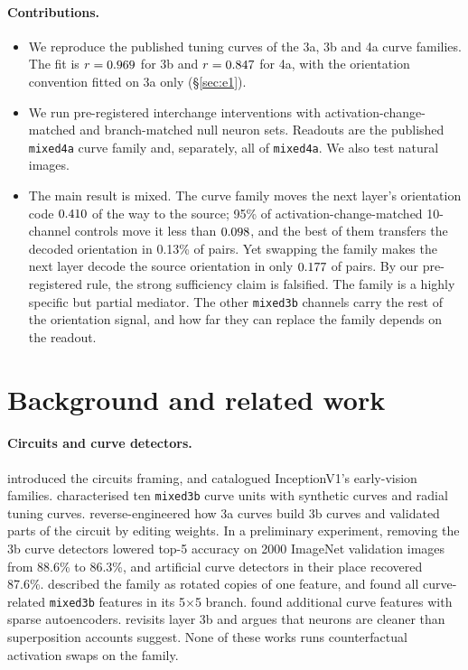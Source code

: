 \documentclass[11pt]{article}
\begin{document}
\paragraph{Contributions.}
\begin{itemize}
\item We reproduce the published tuning curves of the 3a, 3b and 4a curve families. The fit is $r=0.969$ for 3b and $r=0.847$ for 4a, with the orientation convention fitted on 3a only (\S\ref{sec:e1}).
\item We run pre-registered interchange interventions with activation-change-matched and branch-matched null neuron sets. Readouts are the published \texttt{mixed4a} curve family and, separately, all of \texttt{mixed4a}. We also test natural images.
\item The main result is mixed. The curve family moves the next layer's orientation code $0.410$ of the way to the source; 95\% of activation-change-matched 10-channel controls move it less than $0.098$, and the best of them transfers the decoded orientation in 0.13\% of pairs. Yet swapping the family makes the next layer decode the source orientation in only $0.177$ of pairs. By our pre-registered rule, the strong sufficiency claim is falsified. The family is a highly specific but partial mediator. The other \texttt{mixed3b} channels carry the rest of the orientation signal, and how far they can replace the family depends on the readout.
\end{itemize}

\section{Background and related work}
\paragraph{Circuits and curve detectors.}
\citet{olah2020zoom} introduced the circuits framing, and \citet{olah2020early} catalogued InceptionV1's early-vision families. \citet{cammarata2020curve} characterised ten \texttt{mixed3b} curve units with synthetic curves and radial tuning curves. \citet{cammarata2021circuits} reverse-engineered how 3a curves build 3b curves and validated parts of the circuit by editing weights. In a preliminary experiment, removing the 3b curve detectors lowered top-5 accuracy on 2000 ImageNet validation images from 88.6\% to 86.3\%, and artificial curve detectors in their place recovered 87.6\%. \citet{olah2020equivariance} described the family as rotated copies of one feature, and \citet{voss2021branch} found all curve-related \texttt{mixed3b} features in its 5$\times$5 branch. \citet{gorton2024missing} found additional curve features with sparse autoencoders. \citet{cammarata2026clean} revisits layer 3b and argues that neurons are cleaner than superposition accounts suggest. None of these works runs counterfactual activation swaps on the family.
\end{document}
